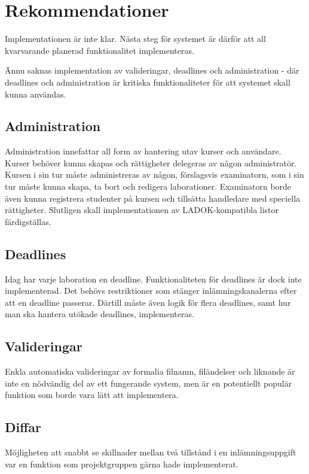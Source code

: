 \section{Rekommendationer}

Implementationen är inte klar. Nästa steg för systemet är därför att all kvarvarande planerad funktionalitet implementeras.

Ännu saknas implementation av valideringar, deadlines och administration - där deadlines och administration är kritiska funktionaliteter för att systemet skall kunna användas. 

\subsection{Administration}
Administration innefattar all form av hantering utav kurser och användare. Kurser behöver kunna skapas och rättigheter delegeras av någon administratör. Kursen i sin tur måste administreras av någon, förslagsvis examinatorn, som i sin tur måste kunna skapa, ta bort och redigera laborationer. Examinatorn borde även kunna registrera studenter på kursen och tillsätta handledare med speciella rättigheter. Slutligen skall implementationen av LADOK-kompatibla listor färdigställas.

\subsection{Deadlines}
Idag har varje laboration en deadline. Funktionaliteten för deadlines är dock inte implementerad. Det behövs restriktioner som stänger inlämningskanalerna efter att en deadline passerar. Därtill måste även logik för flera deadlines, samt hur man ska hantera utökade deadlines, implementeras. 

\subsection{Valideringar}
Enkla automatiska valideringar av formalia filnamn, filändelser och liknande är inte en nödvändig del av ett fungerande system, men är en potentiellt populär funktion som borde vara lätt att implementera.

\subsection{Diffar}

Möjligheten att snabbt se skillnader mellan två tillstånd i en inlämningsuppgift var en funktion som projektgruppen gärna hade implementerat.

